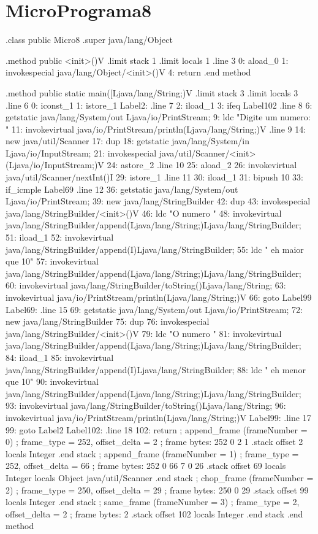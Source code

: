 \documentclass[12pt,a4paper,twoside]{report}
\begin{document}
\section{MicroPrograma8}
\begin{terminal}
.class public Micro8
.super java/lang/Object

.method public <init>()V
  .limit stack 1
  .limit locals 1
  .line 3
  0: aload_0
  1: invokespecial java/lang/Object/<init>()V
  4: return
.end method

.method public static main([Ljava/lang/String;)V
  .limit stack 3
  .limit locals 3
  .line 6
  0: iconst_1
  1: istore_1
Label2:
  .line 7
  2: iload_1
  3: ifeq Label102
  .line 8
  6: getstatic java/lang/System/out Ljava/io/PrintStream;
  9: ldc "Digite um numero: "
  11: invokevirtual java/io/PrintStream/println(Ljava/lang/String;)V
  .line 9
  14: new java/util/Scanner
  17: dup
  18: getstatic java/lang/System/in Ljava/io/InputStream;
  21: invokespecial java/util/Scanner/<init>(Ljava/io/InputStream;)V
  24: astore_2
  .line 10
  25: aload_2
  26: invokevirtual java/util/Scanner/nextInt()I
  29: istore_1
  .line 11
  30: iload_1
  31: bipush 10
  33: if_icmple Label69
  .line 12
  36: getstatic java/lang/System/out Ljava/io/PrintStream;
  39: new java/lang/StringBuilder
  42: dup
  43: invokespecial java/lang/StringBuilder/<init>()V
  46: ldc "O numero "
  48: invokevirtual java/lang/StringBuilder/append(Ljava/lang/String;)Ljava/lang/StringBuilder;
  51: iload_1
  52: invokevirtual java/lang/StringBuilder/append(I)Ljava/lang/StringBuilder;
  55: ldc " eh maior que 10"
  57: invokevirtual java/lang/StringBuilder/append(Ljava/lang/String;)Ljava/lang/StringBuilder;
  60: invokevirtual java/lang/StringBuilder/toString()Ljava/lang/String;
  63: invokevirtual java/io/PrintStream/println(Ljava/lang/String;)V
  66: goto Label99
Label69:
  .line 15
  69: getstatic java/lang/System/out Ljava/io/PrintStream;
  72: new java/lang/StringBuilder
  75: dup
  76: invokespecial java/lang/StringBuilder/<init>()V
  79: ldc "O numero "
  81: invokevirtual java/lang/StringBuilder/append(Ljava/lang/String;)Ljava/lang/StringBuilder;
  84: iload_1
  85: invokevirtual java/lang/StringBuilder/append(I)Ljava/lang/StringBuilder;
  88: ldc " eh menor que 10"
  90: invokevirtual java/lang/StringBuilder/append(Ljava/lang/String;)Ljava/lang/StringBuilder;
  93: invokevirtual java/lang/StringBuilder/toString()Ljava/lang/String;
  96: invokevirtual java/io/PrintStream/println(Ljava/lang/String;)V
Label99:
  .line 17
  99: goto Label2
Label102:
  .line 18
  102: return
  ; append_frame (frameNumber = 0)
  ; frame_type = 252, offset_delta = 2
  ; frame bytes: 252 0 2 1
  .stack
    offset 2
    locals Integer
    .end stack
  ; append_frame (frameNumber = 1)
  ; frame_type = 252, offset_delta = 66
  ; frame bytes: 252 0 66 7 0 26
  .stack
    offset 69
    locals Integer
    locals Object java/util/Scanner
    .end stack
  ; chop_frame (frameNumber = 2)
  ; frame_type = 250, offset_delta = 29
  ; frame bytes: 250 0 29
  .stack
    offset 99
    locals Integer
    .end stack
  ; same_frame (frameNumber = 3)
  ; frame_type = 2, offset_delta = 2
  ; frame bytes: 2
  .stack
    offset 102
    locals Integer
    .end stack
.end method
\end{terminal}
\end{document}
